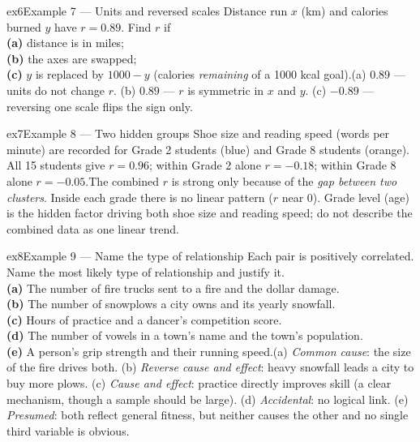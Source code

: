 \documentclass[11pt]{article}
\begin{document}
\begin{example}{ex6}{Example 7 --- Units and reversed scales}
Distance run $x$ (km) and calories burned $y$ have $r=0.89$. Find $r$ if \\ \textbf{(a)} distance is in miles; \\ \textbf{(b)} the axes are swapped; \\ \textbf{(c)} $y$ is replaced by $1000-y$ (calories \emph{remaining} of a 1000 kcal goal).\soln (a) $0.89$ --- units do not change $r$. (b) $0.89$ --- $r$ is symmetric in $x$ and $y$. (c) $-0.89$ --- reversing one scale flips the sign only.
\end{example}

\begin{example}{ex7}{Example 8 --- Two hidden groups}
Shoe size and reading speed (words per minute) are recorded for Grade 2 students (blue) and Grade 8 students (orange). All 15 students give $r=0.96$; within Grade 2 alone $r=-0.18$; within Grade 8 alone $r=-0.05$.\soln The combined $r$ is strong only because of the \emph{gap between two clusters}. Inside each grade there is no linear pattern ($r$ near $0$). Grade level (age) is the hidden factor driving both shoe size and reading speed; do not describe the combined data as one linear trend.
\end{example}

\begin{example}{ex8}{Example 9 --- Name the type of relationship}
Each pair is positively correlated. Name the most likely type of relationship and justify it. \\ \textbf{(a)} The number of fire trucks sent to a fire and the dollar damage. \\ \textbf{(b)} The number of snowplows a city owns and its yearly snowfall. \\ \textbf{(c)} Hours of practice and a dancer's competition score. \\ \textbf{(d)} The number of vowels in a town's name and the town's population. \\ \textbf{(e)} A person's grip strength and their running speed.\soln (a) \emph{Common cause}: the size of the fire drives both. (b) \emph{Reverse cause and effect}: heavy snowfall leads a city to buy more plows. (c) \emph{Cause and effect}: practice directly improves skill (a clear mechanism, though a sample should be large). (d) \emph{Accidental}: no logical link. (e) \emph{Presumed}: both reflect general fitness, but neither causes the other and no single third variable is obvious.
\end{example}
\end{document}
